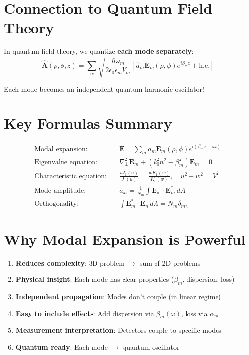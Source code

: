 \documentclass[12pt]{article}
\begin{document}
\section{Connection to Quantum Field Theory}

In quantum field theory, we quantize \textbf{each mode separately}:
\begin{equation}
\hat{\mathbf{A}}(\rho, \phi, z) = \sum_m \sqrt{\frac{\hbar\omega_m}{2\epsilon_0 \epsilon_m V_m}} \left[\hat{a}_m \mathbf{E}_m(\rho, \phi) e^{i\beta_m z} + \text{h.c.}\right]
\end{equation}

Each mode becomes an independent quantum harmonic oscillator!

\section{Key Formulas Summary}

\begin{align}
\text{Modal expansion:} \quad & \mathbf{E} = \sum_m a_m \mathbf{E}_m(\rho,\phi) e^{i(\beta_m z - \omega t)} \\[0.3cm]
\text{Eigenvalue equation:} \quad & \nabla_\perp^2 \mathbf{E}_m + (k_0^2 n^2 - \beta_m^2)\mathbf{E}_m = 0 \\[0.3cm]
\text{Characteristic equation:} \quad & \frac{uJ_1(u)}{J_0(u)} = \frac{wK_1(w)}{K_0(w)}, \quad u^2 + w^2 = V^2 \\[0.3cm]
\text{Mode amplitude:} \quad & a_m = \frac{1}{N_m}\int \mathbf{E}_{\text{in}} \cdot \mathbf{E}_m^* \, dA \\[0.3cm]
\text{Orthogonality:} \quad & \int \mathbf{E}_m^* \cdot \mathbf{E}_n \, dA = N_m \delta_{mn}
\end{align}

\section{Why Modal Expansion is Powerful}

\begin{enumerate}
\item \textbf{Reduces complexity}: 3D problem $\to$ sum of 2D problems
\item \textbf{Physical insight}: Each mode has clear properties ($\beta_m$, dispersion, loss)
\item \textbf{Independent propagation}: Modes don't couple (in linear regime)
\item \textbf{Easy to include effects}: Add dispersion via $\beta_m(\omega)$, loss via $\alpha_m$
\item \textbf{Measurement interpretation}: Detectors couple to specific modes
\item \textbf{Quantum ready}: Each mode $\to$ quantum oscillator
\end{enumerate}
\end{document}
